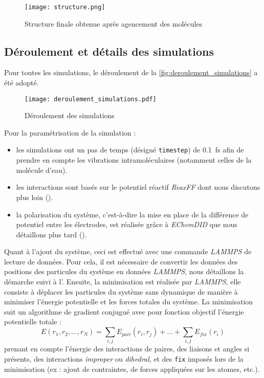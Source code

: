 \begin{figure}[hbp]
    \centering
    \texttt{[image: structure.png]}
    \caption{Structure finale obtenue après agencement des molécules}
    \label{fig:structure_finale}
\end{figure}

    \subsection{Déroulement et détails des simulations}

Pour toutes les simulations, le déroulement de la \autoref{fig:deroulement_simulations} a été adopté.

\begin{figure}[htp]
    \centering
    \texttt{[image: deroulement\_simulations.pdf]}
    \caption{Déroulement des simulations}
    \label{fig:deroulement_simulations}
\end{figure}

Pour la paramétrisation de la simulation :
\begin{itemize}
    \item les simulations ont un pas de temps (désigné \lstinline!timestep!) de \qty{0.1}{\femto \second} afin de prendre en compte les vibrations intramoléculaires (notamment celles de la molécule d'eau). 
    \item les interactions sont basés sur le potentiel réactif \emph{ReaxFF} dont nous discutons plus loin ().
    \item la polarisation du système, c'est-à-dire la mise en place de la différence de potentiel entre les électrodes, est réalisée grâce à \emph{EChemDID} que nous détaillons plus tard ().
\end{itemize}
Quant à l'ajout du système, ceci est effectué avec une commande \emph{LAMMPS} de lecture de données. Pour cela, il est nécessaire de convertir les données des positions des particules du système en données \emph{LAMMPS}, nous détaillons la démarche suivi à l'. %
Ensuite, la minimisation est réalisée par \emph{LAMMPS}, elle consiste à déplacer les particules du système sans dynamique de manière à minimiser l'énergie potentielle et les forces totales du système. La minimisation suit un algorithme de gradient conjugué avec pour fonction objectif l'énergie potentielle totale :
\begin{equation}
    E(r_1, r_2, \dots, r_N) = \sum_{i, j} E_{pair} (r_i, r_j) + \dots + \sum_{i, j} E_{fix} (r_i)
\end{equation}
prenant en compte l'énergie des interactions de paires, des liaisons et angles si présents, des interactions \textit{improper} ou \textit{dihedral}, et des \lstinline!fix! imposés lors de la minimisation (ex : ajout de contraintes, de forces appliquées sur les atomes, etc.).
